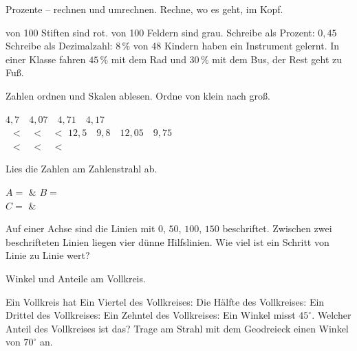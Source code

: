 \setcounter{aufgabe}{0}

\begin{aufgabe}{Prozente -- rechnen und umrechnen. Rechne, wo es geht, im Kopf.}
\begin{teile}
 von 100 Stiften sind rot. 
 von 100 Feldern sind grau. 
\teil Schreibe als Prozent: $0{,}45$ \leerfeld[\%]
\teil Schreibe als Dezimalzahl: $8\,\%$ \leerfeld
{} von 48 Kindern haben ein Instrument gelernt. 
\teil In einer Klasse fahren $45\,\%$ mit dem Rad und $30\,\%$ mit dem Bus, der Rest geht zu Fuß. 
\end{teile}
\end{aufgabe}

\begin{aufgabe}{Zahlen ordnen und Skalen ablesen.}
Ordne von klein nach groß.
\begin{teile}
\teil $4{,}7 \quad 4{,}07 \quad 4{,}71 \quad 4{,}17$ \\[2pt] \leerfeld\ $<$ \leerfeld\ $<$ \leerfeld\ $<$ \leerfeld
\teil $12{,}5 \quad 9{,}8 \quad 12{,}05 \quad 9{,}75$ \\[2pt] \leerfeld\ $<$ \leerfeld\ $<$ \leerfeld\ $<$ \leerfeld
\end{teile}

Lies die Zahlen am Zahlenstrahl ab.


\begin{teilezwei}
\tz $A =$ \leerfeld & \tz $B =$ \leerfeld \\
\tz $C =$ \leerfeld & \\
\end{teilezwei}
\begin{teile}
\teil Auf einer Achse sind die Linien mit $0$, $50$, $100$, $150$ beschriftet. Zwischen zwei beschrifteten Linien liegen vier dünne Hilfslinien. Wie viel ist ein Schritt von Linie zu Linie wert? \leerfeld
\end{teile}
\end{aufgabe}

\begin{aufgabe}{Winkel und Anteile am Vollkreis.}
\begin{teile}
\teil Ein Vollkreis hat \leerfeld[$^\circ$]
\teil Ein Viertel des Vollkreises: \leerfeld[$^\circ$]
\teil Die Hälfte des Vollkreises: \leerfeld[$^\circ$]
\teil Ein Drittel des Vollkreises: \leerfeld[$^\circ$]
\teil Ein Zehntel des Vollkreises: \leerfeld[$^\circ$]
\teil Ein Winkel misst $45^\circ$. Welcher Anteil des Vollkreises ist das? \leerfeld
\teil Trage am Strahl mit dem Geodreieck einen Winkel von $70^\circ$ an.
\end{teile}

\end{aufgabe}

